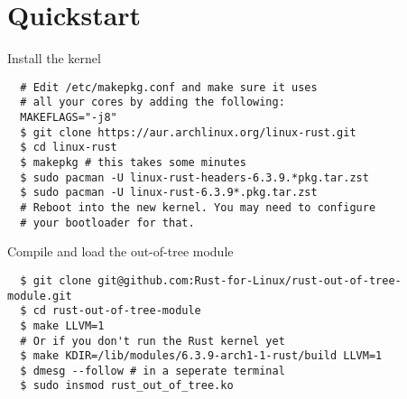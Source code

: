 \section{Quickstart}

\begin{frame}[c,fragile]{Install the kernel}
  \begin{verbatim}
  # Edit /etc/makepkg.conf and make sure it uses
  # all your cores by adding the following:
  MAKEFLAGS="-j8"
  $ git clone https://aur.archlinux.org/linux-rust.git
  $ cd linux-rust
  $ makepkg # this takes some minutes
  $ sudo pacman -U linux-rust-headers-6.3.9.*pkg.tar.zst
  $ sudo pacman -U linux-rust-6.3.9*.pkg.tar.zst
  # Reboot into the new kernel. You may need to configure
  # your bootloader for that.
  \end{verbatim}
\end{frame}

\begin{frame}[c,fragile]{Compile and load the out-of-tree module}
  \begin{verbatim}
  $ git clone git@github.com:Rust-for-Linux/rust-out-of-tree-module.git
  $ cd rust-out-of-tree-module
  $ make LLVM=1
  # Or if you don't run the Rust kernel yet
  $ make KDIR=/lib/modules/6.3.9-arch1-1-rust/build LLVM=1
  $ dmesg --follow # in a seperate terminal
  $ sudo insmod rust_out_of_tree.ko
  \end{verbatim}
\end{frame}
